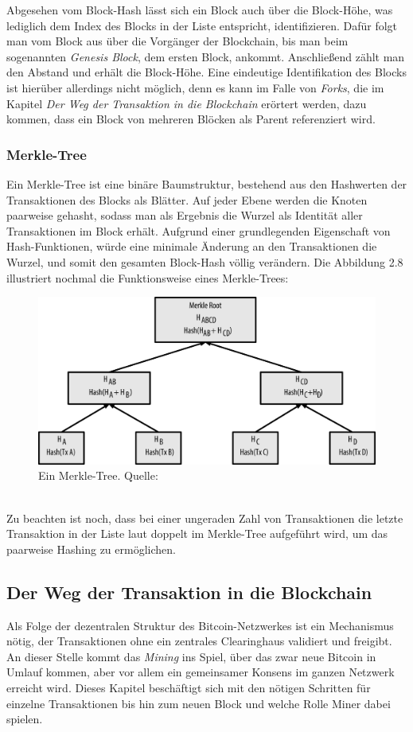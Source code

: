Abgesehen vom Block-Hash lässt sich ein Block auch über die Block-Höhe, was lediglich dem Index des Blocks in der Liste entspricht, identifizieren. 
Dafür folgt man vom Block aus über die Vorgänger der Blockchain, bis man beim sogenannten \emph{Genesis Block}, dem ersten Block, ankommt. 
Anschließend zählt man den Abstand und erhält die Block-Höhe.
Eine eindeutige Identifikation des Blocks ist hierüber allerdings nicht möglich, denn es kann im Falle von \emph{Forks}, die im Kapitel \emph{Der Weg der Transaktion in die Blockchain} erörtert werden, dazu kommen, dass ein Block von mehreren Blöcken als Parent referenziert wird.\\
\subsubsection{Merkle-Tree}
Ein Merkle-Tree ist eine binäre Baumstruktur, bestehend aus den Hashwerten der Transaktionen des Blocks als Blätter. 
Auf jeder Ebene werden die Knoten paarweise gehasht, sodass man als Ergebnis die Wurzel als Identität aller Transaktionen im Block erhält. 
Aufgrund einer grundlegenden Eigenschaft von Hash-Funktionen, würde eine minimale Änderung an den Transaktionen die Wurzel, und somit den gesamten Block-Hash völlig verändern. Die Abbildung 2.8 illustriert nochmal die Funktionsweise eines Merkle-Trees:
\begin{figure}[htpb]
	\centering
	\includegraphics[width=\textwidth]{images/merkle.png}
	\caption{Ein Merkle-Tree.
		Quelle: \cite[S. 201]{antanopoulos_2014}}
	\label{6braun:fig:merkle}
\end{figure}\\
Zu beachten ist noch, dass bei einer ungeraden Zahl von Transaktionen die letzte Transaktion in der Liste laut \cite{antanopoulos_2014} doppelt im Merkle-Tree aufgeführt wird, um das paarweise Hashing zu ermöglichen.
\subsection{Der Weg der Transaktion in die Blockchain}
Als Folge der dezentralen Struktur des Bitcoin-Netzwerkes ist ein Mechanismus nötig, der Transaktionen ohne ein zentrales Clearinghaus validiert und freigibt. An dieser Stelle kommt das \emph{Mining} ins Spiel, über das zwar neue Bitcoin in Umlauf kommen, aber vor allem ein gemeinsamer Konsens im ganzen Netzwerk erreicht wird.
Dieses Kapitel beschäftigt sich mit den nötigen Schritten für einzelne Transaktionen bis hin zum neuen Block und welche Rolle Miner dabei spielen.
